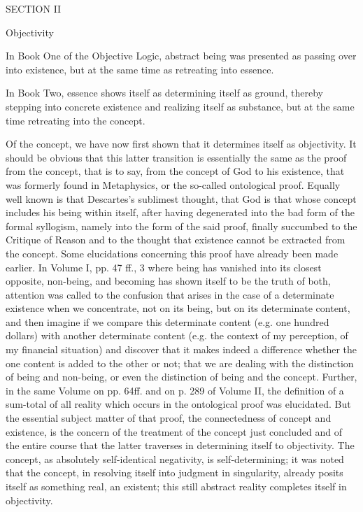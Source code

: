 SECTION II

Objectivity

In Book One of the Objective Logic,
abstract being was presented as
passing over into existence,
but at the same time as
retreating into essence.

In Book Two, essence shows itself as
determining itself as ground,
thereby stepping into concrete existence
and realizing itself as substance,
but at the same time
retreating into the concept.

Of the concept, we have now first shown
that it determines itself as objectivity.
It should be obvious that this latter transition is
essentially the same as the proof from the concept,
that is to say, from the concept of God to his existence,
that was formerly found in
Metaphysics, or the so-called ontological proof.
Equally well known is that
Descartes's sublimest thought,
that God is that whose concept includes his
being within itself,
after having degenerated into the bad form of the formal
syllogism, namely into the form of the said proof, finally succumbed to
the Critique of Reason and to the thought that existence cannot be extracted
from the concept.
Some elucidations concerning this proof have already
been made earlier. In Volume I, pp. 47 ff., 3 where being has vanished into
its closest opposite, non-being,
and becoming has shown itself to be the
truth of both,
attention was called to the confusion that arises in the case
of a determinate existence when we concentrate, not on its being,
but on its determinate content,
and then imagine if we compare this determinate content
(e.g. one hundred dollars) with another determinate content
(e.g. the context of my perception, of my financial situation)
and discover that it makes indeed a difference whether
the one content is added to the other or not;
that we are dealing with the distinction of being and non-being,
or even the distinction of being and the concept.
Further, in the same Volume
on pp. 64ff. and on p. 289 of Volume II,
the definition of a sum-total of all reality
which occurs in the ontological proof was elucidated.
But the essential subject matter of that proof,
the connectedness of concept and existence,
is the concern of the treatment of the concept just concluded
and of the entire course that the latter traverses
in determining itself to objectivity.
The concept, as absolutely self-identical negativity,
is self-determining;
it was noted that the concept,
in resolving itself into judgment in singularity,
already posits itself as something real, an existent;
this still abstract reality completes itself in objectivity.

